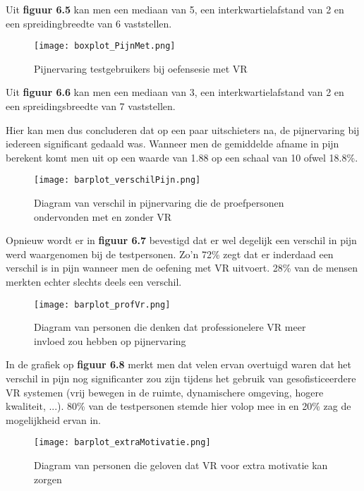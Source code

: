 Uit \textbf{figuur 6.5} kan men een mediaan van 5, een interkwartielafstand van 2 en een spreidingbreedte van 6 vaststellen.

\begin{figure}[h]
    \centering
    \texttt{[image: boxplot\_PijnMet.png]}
    \caption{Pijnervaring testgebruikers bij oefensesie met VR}
    \label{figuur 6.6}
\end{figure}

Uit \textbf{figuur 6.6} kan men een mediaan van 3, een interkwartielafstand van 2 en een spreidingsbreedte van 7 vaststellen.

Hier kan men dus concluderen dat op een paar uitschieters na, de pijnervaring bij iedereen significant gedaald was. Wanneer men de gemiddelde afname in pijn berekent komt men uit op een waarde van 1.88 op een schaal van 10 ofwel 18.8\%.

\begin{figure}[h]
    \centering
    \texttt{[image: barplot\_verschilPijn.png]}
    \caption{Diagram van verschil in pijnervaring die de proefpersonen ondervonden met en zonder VR}
    \label{figuur 6.7}
\end{figure}

\newpage

Opnieuw wordt er in \textbf{figuur 6.7} bevestigd dat er wel degelijk een verschil in pijn werd waargenomen bij de testpersonen. Zo'n 72\% zegt dat er inderdaad een verschil is in pijn wanneer men de oefening met VR uitvoert. 28\% van de mensen merkten echter slechts deels een verschil.

\begin{figure}[h]
    \centering
    \texttt{[image: barplot\_profVr.png]}
    \caption{Diagram van personen die denken dat professionelere VR meer invloed zou hebben op pijnervaring}
    \label{figuur 6.8}
\end{figure}

In de grafiek op \textbf{figuur 6.8} merkt men dat velen ervan overtuigd waren dat het verschil in pijn nog significanter zou zijn tijdens het gebruik van gesofisticeerdere VR systemen (vrij bewegen in de ruimte, dynamischere omgeving, hogere kwaliteit, ...). 80\% van de testpersonen stemde hier volop mee in en 20\% zag de mogelijkheid ervan in.

\begin{figure}[h]
    \centering
    \texttt{[image: barplot\_extraMotivatie.png]}
    \caption{Diagram van personen die geloven dat VR voor extra motivatie kan zorgen}
    \label{figuur 6.9}
\end{figure}

